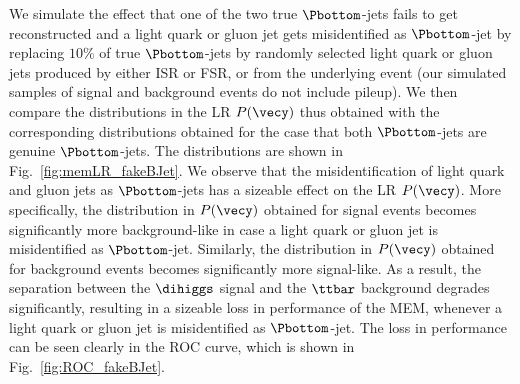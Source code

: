 We simulate the effect that one of the two true $\Pbottom$-jets fails to get reconstructed and a light quark or gluon jet gets misidentified as $\Pbottom$-jet
by replacing $10\%$ of true $\Pbottom$-jets by randomly selected light quark or gluon jets produced by either ISR or FSR, or from the underlying event 
(our simulated samples of signal and background events do not include pileup). 
We then compare the distributions in the LR $P(\vecy)$ thus obtained with the corresponding distributions obtained for the case that both $\Pbottom$-jets are genuine $\Pbottom$-jets.
The distributions are shown in Fig.~\ref{fig:memLR_fakeBJet}.
We observe that the misidentification of light quark and gluon jets as $\Pbottom$-jets has a sizeable effect on the LR $P(\vecy)$.
More specifically, the distribution in $P(\vecy)$ obtained for signal events becomes significantly more background-like
in case a light quark or gluon jet is misidentified as $\Pbottom$-jet.
Similarly, the distribution in $P(\vecy)$ obtained for background events becomes significantly more signal-like.
As a result, the separation between the $\dihiggs$ signal and the $\ttbar$ background degrades significantly,
resulting in a sizeable loss in performance of the MEM, whenever a light quark or gluon jet is misidentified as $\Pbottom$-jet.
The loss in performance can be seen clearly in the ROC curve, which is shown in Fig.~\ref{fig:ROC_fakeBJet}.


